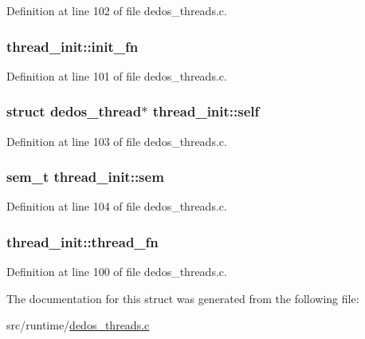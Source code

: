 Definition at line 102 of file dedos\-\_\-threads.\-c.

\hypertarget{structthread__init_a3f5a046298ba770824a83f652ddbc7ae}{
\subsubsection[{init\-\_\-fn}]{ thread\-\_\-init\-::init\-\_\-fn}}\label{structthread__init_a3f5a046298ba770824a83f652ddbc7ae}


Definition at line 101 of file dedos\-\_\-threads.\-c.

\hypertarget{structthread__init_a35c0110fa8e8385bd0c6e823a7e5c30a}{
\subsubsection[{self}]{\setlength{\rightskip}{0pt plus 5cm}struct {\bf dedos\-\_\-thread}$\ast$ thread\-\_\-init\-::self}}\label{structthread__init_a35c0110fa8e8385bd0c6e823a7e5c30a}


Definition at line 103 of file dedos\-\_\-threads.\-c.

\hypertarget{structthread__init_a609ec6696aaa7d760a8154ddee7e8a49}{
\subsubsection[{sem}]{\setlength{\rightskip}{0pt plus 5cm}sem\-\_\-t thread\-\_\-init\-::sem}}\label{structthread__init_a609ec6696aaa7d760a8154ddee7e8a49}


Definition at line 104 of file dedos\-\_\-threads.\-c.

\hypertarget{structthread__init_abbea592e098189df8940eb597cb53ecc}{
\subsubsection[{thread\-\_\-fn}]{ thread\-\_\-init\-::thread\-\_\-fn}}\label{structthread__init_abbea592e098189df8940eb597cb53ecc}


Definition at line 100 of file dedos\-\_\-threads.\-c.



The documentation for this struct was generated from the following file\-:\begin{DoxyCompactItemize}
\item 
src/runtime/\hyperlink{dedos__threads_8c}{dedos\-\_\-threads.\-c}\end{DoxyCompactItemize}
